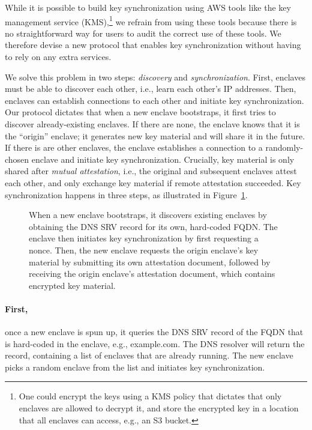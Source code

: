 While it is possible to build key synchronization using AWS tools like the key
management service (KMS),\footnote{One could encrypt the keys using a KMS
policy that dictates that only enclaves are allowed to decrypt it, and store
the encrypted key in a location that all enclaves can access, e.g., an S3
bucket.} we refrain from using these tools because there is no straightforward
way for users to audit the correct use of these tools.  We therefore devise a
new protocol that enables key synchronization without having to rely on any
extra services.

We solve this problem in two steps: \emph{discovery} and
\emph{synchronization}.  First, enclaves must be able to discover each other,
i.e., learn each other's IP addresses.  Then, enclaves can establish
connections to each other and initiate key synchronization.  Our protocol
dictates that when a new enclave bootstraps, it first tries to discover
already-existing enclaves.  If there are none, the enclave knows that it is the
``origin'' enclave; it generates new key material and will share it in the
future.  If there is are other enclaves, the enclave establishes a connection
to a randomly-chosen enclave and initiate key synchronization.  Crucially, key
material is only shared after \emph{mutual attestation}, i.e., the original and
subsequent enclaves attest each other, and only exchange key material if remote
attestation succeeded.  Key synchronization happens in three steps, as
illustrated in Figure~\ref{fig:key-synchronization}.

\begin{figure}[t]
  \centering
  
  \caption{When a new enclave bootstraps, it discovers existing enclaves by
    obtaining the DNS SRV record for its own, hard-coded FQDN.  The enclave then
    initiates key synchronization by first requesting a nonce.  Then, the new
    enclave requests the origin enclave's key material by submitting its own
    attestation document, followed by receiving the origin enclave's attestation
    document, which contains encrypted key material.}
  \label{fig:key-synchronization}
\end{figure}

\paragraph{First,} once a new enclave is spun up, it queries the DNS SRV record
of the FQDN that is hard-coded in the enclave, e.g., example.com.  The DNS
resolver will return the record, containing a list of enclaves that are already
running.  The new enclave picks a random enclave from the list and initiates
key synchronization.

